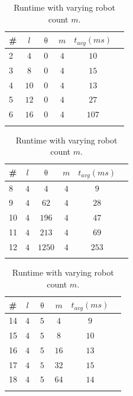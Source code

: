 \documentclass{svproc}
\begin{document}
\begin{table}[!htb]%
\begin{minipage}{.3\textwidth}
    \centering
    \begin{tabular}{|l|c|c|c|c|r|}
        \hline
         \#&$l$&$\uptheta$ &$m$&$t_{avg}(ms)$  \\ \hline
         2 & $4$ & $0$ & $4$ & $10$\\ \hline
         3 & $8$ & $0$ & $4$ & $15$\\ \hline
         4 & $10$ & $0$ & $4$ & $13$ \\ \hline
         5 & $12$ & $0$ & $4$ & $27$ \\ \hline
         6 & $16$ & $0$ & $4$ & $107$ \\ \hline
         \multicolumn{5}{c}{}\\
    \end{tabular}
    \caption{Runtime with varying curve count $l$.}
    \label{tab:curveCountScalability}
\end{minipage}
\hfill
\begin{minipage}{.3\textwidth}
    \centering
    \begin{tabular}{|l|c|c|c|c|r|}
        \hline
         \#&$l$&$\uptheta$ &$m$&$t_{avg}(ms)$  \\ \hline
         8 & $4$ & $4$ & $4$ & $9$ \\ \hline
         9 & $4$ & $62$ & $4$ & $28$ \\ \hline
         10 & $4$ & $196$ & $4$ & $47$  \\ \hline
         11 & $4$ & $213$ & $4$ & $69$  \\ \hline
         12 & $4$ & $1250$ & $4$ & $253$  \\ \hline
         \multicolumn{5}{c}{}\\
    \end{tabular}
    \caption{Runtime with varying occupied cells $\uptheta$.}
    \label{tab:obstacleCountScalability}
\end{minipage}
\hfill
\begin{minipage}{.3\textwidth}
    \centering
    \begin{tabular}{|l|c|c|c|c|r|}
        \hline
         \#&$l$&$\uptheta$ &$m$&$t_{avg}(ms)$  \\ \hline
         14 & $4$ & $5$ & $4$ &$9$\\ \hline
         15 & $4$ & $5$ & $8$ & $10$ \\ \hline
         16 & $4$ & $5$ & $16$ & $13$ \\ \hline
         17 & $4$ & $5$ & $32$ & $15$  \\ \hline
         18 & $4$ & $5$ & $64$ & $14$  \\ \hline
         \multicolumn{5}{c}{}\\
    \end{tabular}
    \caption{Runtime with varying robot count $m$.}
    \label{tab:robotCountScalability}
\end{minipage}
\end{table}
\end{document}

